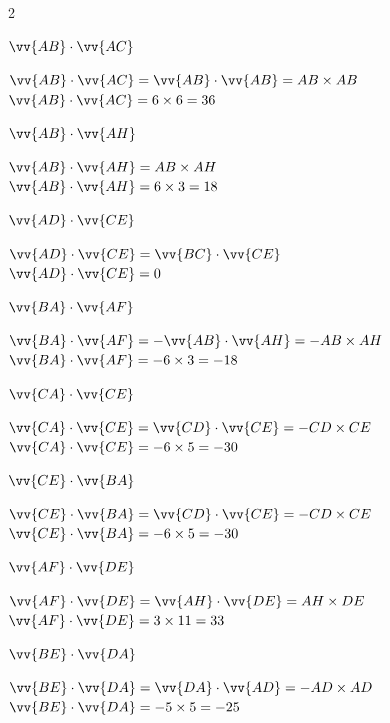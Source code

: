 \documentclass[12pt,a4paper]{article}  %
\begin{document}
\begin{multicols}{2}
	\begin{enumMet}
		\item $ \vv{A B} \cdot  \vv{A C}$
		\begin{corrBox}
			$ \vv{A B} \cdot  \vv{A C}= \vv{A B} \cdot  \vv{A B}=AB\times AB$\\ 
			$ \vv{A B} \cdot  \vv{A C}= 6\times6=36$
		\end{corrBox}
		\item $ \vv{A B} \cdot  \vv{A H}$
		\begin{corrBox}
			$ \vv{A B} \cdot  \vv{A H}= AB\times AH$\\ 
			$ \vv{A B} \cdot  \vv{A H}= 6\times3=18$
		\end{corrBox}
		\item $ \vv{A D} \cdot  \vv{C E}$
		\begin{corrBox}
			$ \vv{A D} \cdot  \vv{CE}= \vv{BC} \cdot  \vv{CE}$\\ 
			$ \vv{A D} \cdot  \vv{CE}= 0$
		\end{corrBox}
		\item $ \vv{B A} \cdot  \vv{A F}$
		\begin{corrBox}
			$ \vv{BA} \cdot  \vv{AF}= -\vv{A B} \cdot  \vv{A H}=-AB\times AH$\\ 
			$ \vv{BA} \cdot  \vv{AF}= -6\times3=-18$
		\end{corrBox}
		
		\columnbreak
		\item $ \vv{C A} \cdot  \vv{C E}$
		\begin{corrBox}
			$ \vv{CA} \cdot  \vv{CE}= \vv{CD} \cdot  \vv{CE}=-CD\times CE$\\ 
			$ \vv{CA} \cdot  \vv{CE}=- 6\times5=-30$
		\end{corrBox}
		\item $ \vv{C E} \cdot  \vv{B A}$
		\begin{corrBox}
			$ \vv{CE} \cdot  \vv{BA}= \vv{CD} \cdot  \vv{CE}=-CD\times CE$\\ 
			$ \vv{CE} \cdot  \vv{BA}= -6\times5=-30$
		\end{corrBox}
		\item $ \vv{A F} \cdot  \vv{D E}$
		\begin{corrBox}
			$ \vv{A F} \cdot  \vv{DE}= \vv{AH} \cdot  \vv{DE}=AH\times DE$\\ 
			$ \vv{AF} \cdot  \vv{DE}= 3\times11=33$
		\end{corrBox}
		\item $ \vv{B E} \cdot  \vv{D A}$
		\begin{corrBox}
			$ \vv{BE} \cdot  \vv{DA}= \vv{DA} \cdot  \vv{AD}=-AD\times AD$\\ 
			$ \vv{BE} \cdot  \vv{DA}= -5\times5=-25$
		\end{corrBox}
	\end{enumMet}
\end{multicols}
\end{document}
